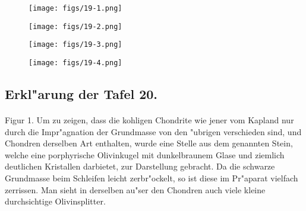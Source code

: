\documentclass[a4paper, 11pt, oneside, polutonikogreek, german]{article}
\begin{document}
\vspace*{\fill}
\begin{figure}[H]
\centering
\texttt{[image: figs/19-1.png]}
\caption{}
\end{figure}
\vspace*{\fill}
\clearpage

\vspace*{\fill}
\begin{figure}[H]
\centering
\texttt{[image: figs/19-2.png]}
\caption{}
\end{figure}
\vspace*{\fill}
\clearpage

\vspace*{\fill}
\begin{figure}[H]
\centering
\texttt{[image: figs/19-3.png]}
\caption{}
\end{figure}
\vspace*{\fill}
\clearpage

\vspace*{\fill}
\begin{figure}[H]
\centering
\texttt{[image: figs/19-4.png]}
\caption{}
\end{figure}
\vspace*{\fill}
\clearpage

\subsection{Erkl"arung der Tafel 20.}
\paragraph{}
Figur 1. Um zu zeigen, dass die kohligen Chondrite wie jener vom Kapland nur durch die Impr"agnation der Grundmasse von den "ubrigen verschieden sind, und Chondren derselben Art enthalten, wurde eine Stelle aus dem genannten Stein, welche eine porphyrische Olivinkugel mit dunkelbraunem Glase und ziemlich deutlichen Kristallen darbietet, zur Darstellung gebracht. Da die schwarze Grundmasse beim Schleifen leicht zerbr"ockelt, so ist diese im Pr"aparat vielfach zerrissen. Man sieht in derselben au"ser den Chondren auch viele kleine durchsichtige Olivinsplitter.
\end{document}
